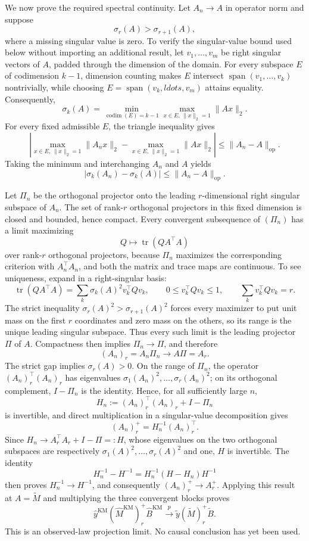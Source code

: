 We now prove the required spectral continuity. Let \(A_n\to A\) in operator norm and suppose
\[
\sigma_r(A)>\sigma_{r+1}(A),
\]
where a missing singular value is zero. To verify the singular-value bound used below without importing an additional result, let \(v_1,\ldots,v_m\) be right singular vectors of \(A\), padded through the dimension of the domain. For every subspace \(E\) of codimension \(k-1\), dimension counting makes \(E\) intersect \(\operatorname{span}(v_1,\ldots,v_k)\) nontrivially, while choosing \(E=\operatorname{span}(v_k,ldots,v_m)\) attains equality. Consequently,
\[
\sigma_k(A)=\min_{\operatorname{codim}(E)=k-1}
 \max_{x\in E,\,\|x\|_2=1}\|Ax\|_2.
\]
For every fixed admissible \(E\), the triangle inequality gives
\[
\left|\max_{x\in E,\,\|x\|_2=1}\|A_nx\|_2-
\max_{x\in E,\,\|x\|_2=1}\|Ax\|_2\right|
\le \|A_n-A\|_{\mathrm{op}}.
\]
Taking the minimum and interchanging \(A_n\) and \(A\) yields
\[
|\sigma_k(A_n)-\sigma_k(A)|\le\|A_n-A\|_{\mathrm{op}}.
\]

Let \(\Pi_n\) be the orthogonal projector onto the leading \(r\)-dimensional right singular subspace of \(A_n\). The set of rank-\(r\) orthogonal projectors in this fixed dimension is closed and bounded, hence compact. Every convergent subsequence of \((\Pi_n)\) has a limit maximizing
\[
Q\longmapsto\operatorname{tr}(QA^\top A)
\]
over rank-\(r\) orthogonal projectors, because \(\Pi_n\) maximizes the corresponding criterion with \(A_n^\top A_n\), and both the matrix and trace maps are continuous. To see uniqueness, expand in a right-singular basis:
\[
\operatorname{tr}(QA^\top A)=\sum_k\sigma_k(A)^2v_k^\top Qv_k,
\qquad 0\le v_k^\top Qv_k\le1,
\qquad \sum_kv_k^\top Qv_k=r.
\]
The strict inequality \(\sigma_r(A)^2>\sigma_{r+1}(A)^2\) forces every maximizer to put unit mass on the first \(r\) coordinates and zero mass on the others, so its range is the unique leading singular subspace. Thus every such limit is the leading projector \(\Pi\) of \(A\). Compactness then implies \(\Pi_n\to\Pi\), and therefore
\[
(A_n)_r=A_n\Pi_n\longrightarrow A\Pi=A_r.
\]
The strict gap implies \(\sigma_r(A)>0\). On the range of \(\Pi_n\), the operator \((A_n)_r^\top(A_n)_r\) has eigenvalues \(\sigma_1(A_n)^2,\ldots,\sigma_r(A_n)^2\); on its orthogonal complement, \(I-\Pi_n\) is the identity. Hence, for all sufficiently large \(n\),
\[
H_n:=(A_n)_r^\top(A_n)_r+I-\Pi_n
\]
is invertible, and direct multiplication in a singular-value decomposition gives
\[
(A_n)_r^+=H_n^{-1}(A_n)_r^\top.
\]
Since \(H_n\to A_r^\top A_r+I-\Pi=:H\), whose eigenvalues on the two orthogonal subspaces are respectively \(\sigma_1(A)^2,\ldots,\sigma_r(A)^2\) and one, \(H\) is invertible. The identity
\[
H_n^{-1}-H^{-1}=H_n^{-1}(H-H_n)H^{-1}
\]
then proves \(H_n^{-1}\to H^{-1}\), and consequently \((A_n)_r^+\to A_r^+\). Applying this result at \(A=\widetilde M\) and multiplying the three convergent blocks proves
\[
\widehat y^{\mathrm{KM}}(\widehat M^{\mathrm{KM}})_r^+
\widehat B^{\mathrm{KM}}
\xrightarrow{p}
\widetilde y(\widetilde M)_r^+\widetilde B.
\]
This is an observed-law projection limit. No causal conclusion has yet been used.

